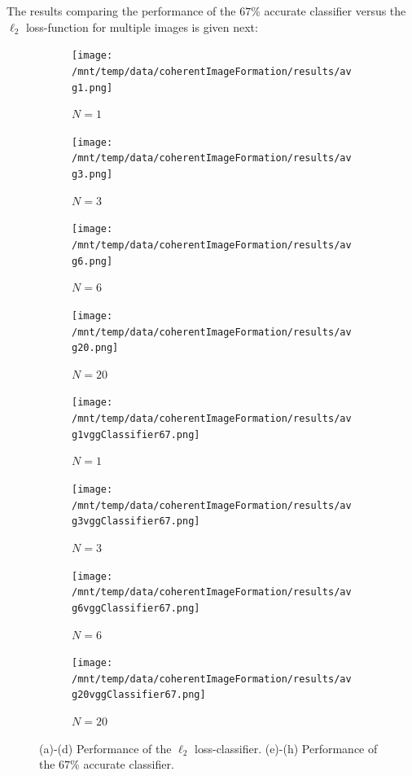 \documentclass[a4paper, 11pt]{article}
\begin{document}
The results comparing the performance of the $67\%$ accurate classifier versus the $\ell_2$ loss-function for multiple images is given next:
\begin{figure}[h]
\centering
\begin{subfigure}[b]{0.22\textwidth}
        \texttt{[image: /mnt/temp/data/coherentImageFormation/results/avg1.png]}
        \caption{$N = 1$}
        \label{fig:avg1}
    \end{subfigure}
    \begin{subfigure}[b]{0.22\textwidth}
        \texttt{[image: /mnt/temp/data/coherentImageFormation/results/avg3.png]}
        \caption{$N = 3$}
        \label{fig:avg3}
    \end{subfigure}
    \begin{subfigure}[b]{0.22\textwidth}
        \texttt{[image: /mnt/temp/data/coherentImageFormation/results/avg6.png]}
        \caption{$N = 6$}
        \label{fig:avg6}
    \end{subfigure}
    \begin{subfigure}[b]{0.22\textwidth}
        \texttt{[image: /mnt/temp/data/coherentImageFormation/results/avg20.png]}
        \caption{$N = 20$}
        \label{fig:avg20}
    \end{subfigure}
\begin{subfigure}[b]{0.22\textwidth}
        \texttt{[image: /mnt/temp/data/coherentImageFormation/results/avg1vggClassifier67.png]}
        \caption{$N = 1$}
        \label{fig:avg1}
    \end{subfigure}
    \begin{subfigure}[b]{0.22\textwidth}
        \texttt{[image: /mnt/temp/data/coherentImageFormation/results/avg3vggClassifier67.png]}
        \caption{$N = 3$}
        \label{fig:avg3}
    \end{subfigure}
    \begin{subfigure}[b]{0.22\textwidth}
        \texttt{[image: /mnt/temp/data/coherentImageFormation/results/avg6vggClassifier67.png]}
        \caption{$N = 6$}
        \label{fig:avg6}
    \end{subfigure}
    \begin{subfigure}[b]{0.22\textwidth}
        \texttt{[image: /mnt/temp/data/coherentImageFormation/results/avg20vggClassifier67.png]}
        \caption{$N = 20$}
        \label{fig:avg20}
    \end{subfigure}
\caption{(a)-(d) Performance of the $\ell_2$ loss-classifier. (e)-(h) Performance of the $67\%$ accurate classifier. }
\label{fig:avgFig}
\end{figure}
\clearpage 
\newpage 
\end{document}

